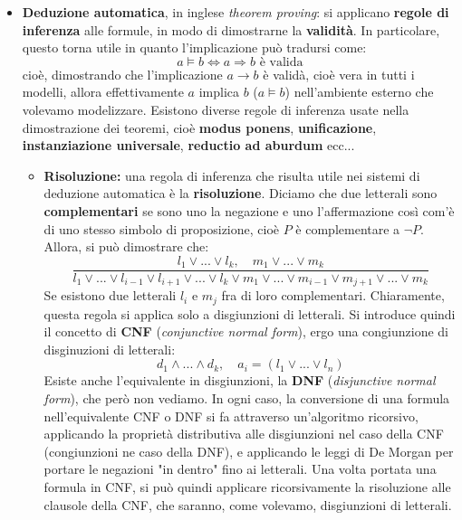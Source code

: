 \documentclass[a4paper,11pt]{article}
\begin{document}
\begin{itemize}
\begin{itemize}
\begin{itemize}
				\end{itemize}
		\end{itemize}
	\item \textbf{Deduzione automatica}, in inglese \textit{theorem proving}: si applicano \textbf{regole di inferenza} alle formule, in modo di dimostrarne la \textbf{validità}. In particolare, questo torna utile in quanto l'implicazione può tradursi come:
$$
a \models b \Leftrightarrow a \Rightarrow b \text{ è valida}
$$
cioè, dimostrando che l'implicazione $a \rightarrow b$ è validà, cioè vera in tutti i modelli, allora effettivamente $a$ implica $b$ ($a \models b$) nell'ambiente esterno che volevamo modelizzare.
Esistono diverse regole di inferenza usate nella dimostrazione dei teoremi, cioè \textbf{modus ponens}, \textbf{unificazione}, \textbf{instanziazione universale}, \textbf{reductio ad aburdum} ecc... 

\begin{itemize}
	\item \textbf{Risoluzione:} 
una regola di inferenza che risulta utile nei sistemi di deduzione automatica è la \textbf{risoluzione}.
Diciamo che due letterali sono \textbf{complementari} se sono uno la negazione e uno l'affermazione così com'è di uno stesso simbolo di proposizione, cioè $P$ è complementare a $\neg P$.
Allora, si può dimostrare che:
$$
\frac{l_1 \vee ... \vee l_k, \quad m_1 \vee ... \vee m_k}{l_1 \vee ... \vee l_{i-1} \vee l_{i+1} \vee ... \vee l_k \vee m_1 \vee ... \vee m_{i-1} \vee m_{j+1} \vee ... \vee m_k}
$$
Se esistono due letterali $l_i$ e $m_j$ fra di loro complementari.
Chiaramente, questa regola si applica solo a disgiunzioni di letterali.
Si introduce quindi il concetto di \textbf{CNF} (\textit{conjunctive normal form}), ergo una congiunzione di disginuzioni di letterali:
$$
d_1 \wedge ... \wedge d_k, \quad a_i = (l_1 \vee ... \vee l_n)
$$
Esiste anche l'equivalente in disgiunzioni, la \textbf{DNF} (\textit{disjunctive normal form}), che però non vediamo.
In ogni caso, la conversione di una formula nell'equivalente CNF o DNF si fa attraverso un'algoritmo ricorsivo, applicando la proprietà distributiva alle disgiunzioni nel caso della CNF (congiunzioni ne caso della DNF), e applicando le leggi di De Morgan per portare le negazioni "in dentro" fino ai letterali.
Una volta portata una formula in CNF, si può quindi applicare ricorsivamente la risoluzione alle clausole della CNF, che saranno, come volevamo, disgiunzioni di letterali.


\end{itemize}
\end{itemize}
\end{document}
